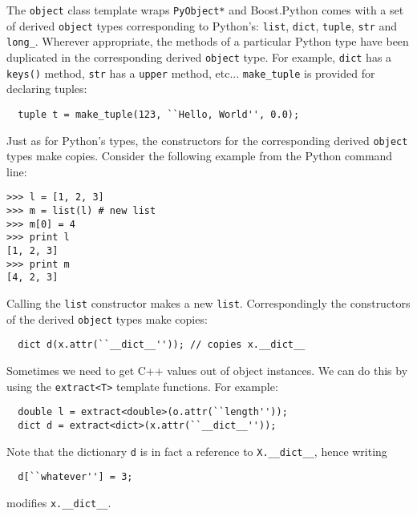 The \verb|object| class template wraps \verb|PyObject*| and Boost.Python comes with a set of derived \verb|object| types corresponding to Python's: \verb|list|, \verb|dict|, \verb|tuple|, \verb|str| and  \verb|long_|. Wherever appropriate, the methods of a particular Python type have been duplicated in the corresponding derived \verb|object| type. For example, \verb|dict| has a \verb|keys()| method, \verb|str| has a \verb|upper| method, etc... \verb|make_tuple| is provided for declaring tuples:
\begin{verbatim}
  tuple t = make_tuple(123, ``Hello, World'', 0.0);
\end{verbatim}
Just as for Python's types, the constructors for the corresponding derived \verb|object| types make copies. Consider the following example from the Python command line:
\begin{verbatim}
>>> l = [1, 2, 3]
>>> m = list(l) # new list
>>> m[0] = 4
>>> print l
[1, 2, 3]
>>> print m
[4, 2, 3]
\end{verbatim}
Calling the \verb|list| constructor makes a new \verb|list|. Correspondingly the constructors of the derived \verb|object| types make copies:
\begin{verbatim}
  dict d(x.attr(``__dict__'')); // copies x.__dict__ 
\end{verbatim}
Sometimes we need to get C++ values out of object instances. We can do this by using the \verb|extract<T>| template functions. For example:
\begin{verbatim}
  double l = extract<double>(o.attr(``length''));
  dict d = extract<dict>(x.attr(``__dict__''));
\end{verbatim}
Note that the dictionary \verb|d| is in fact a reference to \verb|X.__dict__|, hence writing
\begin{verbatim}
  d[``whatever''] = 3;
\end{verbatim}
modifies \verb|x.__dict__|. 

